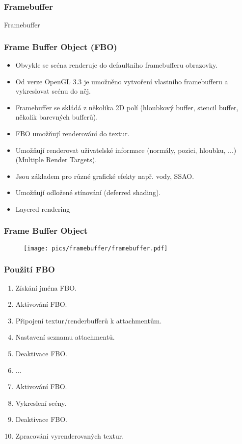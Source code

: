 \begin{frame}
\frametitle{Framebuffer}
\begin{center}
\Huge {\color{white}Framebuffer}
\end{center}
\end{frame}

\begin{frame}[fragile]
\frametitle{Frame Buffer Object (FBO)}
  \begin{itemize}
    \item Obvykle se scéna renderuje do defaultního framebufferu obrazovky.
    \item Od verze OpenGL 3.3 je umožněno vytvoření vlastního framebufferu a vykreslovat scénu do něj.
    \item Framebuffer se skládá z několika 2D polí (hloubkový buffer, stencil buffer, několik barevných bufferů).
    \item{FBO umožňují renderování do textur.}
    \item{Umožňují renderovat uživatelské informace (normály, pozici, hloubku, ...) (Multiple Render Targets).}
    \item{Jsou základem pro různé grafické efekty např. vody, SSAO.}
    \item{Umožňují odložené stínování (deferred shading).}
    \item{Layered rendering}
  \end{itemize}
\end{frame}

\begin{frame}
\frametitle{Frame Buffer Object}
  \begin{figure}[h]
  \texttt{[image: pics/framebuffer/framebuffer.pdf]}
  \end{figure}
\end{frame}


\begin{frame}
\frametitle{Použití FBO}
    \begin{enumerate}
        \item{Získání jména FBO.}
        \item{Aktivování FBO.}
        \item{Připojení textur/renderbufferů k attachmentům.}
        \item{Nastavení seznamu attachmentů.}
        \item{Deaktivace FBO.}
        \item{...}
        \item{Aktivování FBO.}
        \item{Vykreslení scény.}
        \item{Deaktivace FBO.}
        \item{Zpracování vyrenderovaných textur.}
    \end{enumerate}
\end{frame}

